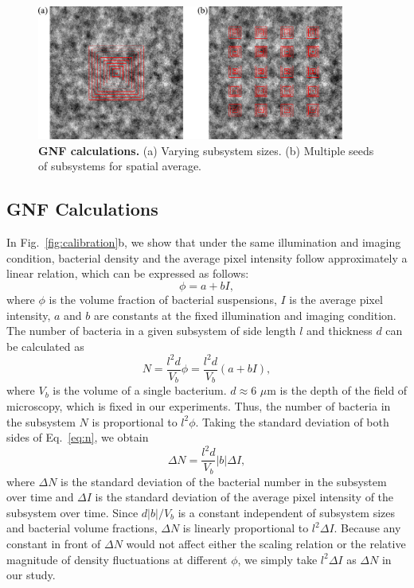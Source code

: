 \begin{figure}[ht]
\begin{center}
\includegraphics[width=0.9\textwidth]{figs/5-GNF/GNF-calculations.pdf}
\caption[GNF calculations]
{
\textbf{GNF calculations.}
(a) Varying subsystem sizes.
(b) Multiple seeds of subsystems for spatial average.
}
\label{GNF-calculation}
\end{center}
\end{figure}

\subsection{GNF Calculations}
In Fig.~\ref{fig:calibration}b, we show that under the same illumination and imaging condition, bacterial density and the average pixel intensity follow approximately a linear relation, which can be expressed as follows:
\begin{equation}
\label{eq:phi-I-relation}
\phi = a + bI,
\end{equation}
where $\phi$ is the volume fraction of bacterial suspensions, $I$ is the average pixel intensity, $a$ and $b$ are constants at the fixed illumination and imaging condition. The number of bacteria in a given subsystem of side length $l$ and thickness $d$ can be calculated as
\begin{equation}
\label{eq:n}
N = \frac{l^2d}{V_b} \phi = \frac{l^2d}{V_b} (a+bI),
\end{equation}
where $V_b$ is the volume of a single bacterium. $d \approx 6$ $\mu$m is the depth of the field of microscopy, which is fixed in our experiments. Thus, the number of bacteria in the subsystem $N$ is proportional to $l^2 \phi$. Taking the standard deviation of both sides of Eq.~\ref{eq:n}, we obtain
\begin{equation}
\label{intensity-number}
\Delta N = \frac{l^2 d}{V_b}|b|\Delta I,
\end{equation}
where $\Delta N$ is the standard deviation of the bacterial number in the subsystem over time and $\Delta I$ is the standard deviation of the average pixel intensity of the subsystem over time. Since $d|b|/V_b$ is a constant independent of subsystem sizes and bacterial volume fractions, $\Delta N$ is linearly proportional to $l^2\Delta I$. Because any constant in front of $\Delta N$ would not affect either the scaling relation or the relative magnitude of density fluctuations at different $\phi$, we simply take $l^2\Delta I$ as $\Delta N$ in our study.

